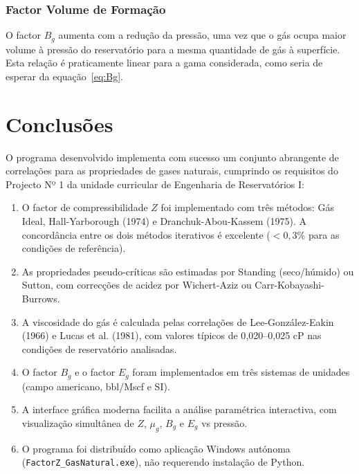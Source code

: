 \documentclass[12pt, a4paper]{article}
\begin{document}
\subsubsection{Factor Volume de Formação}

O factor $B_g$ aumenta com a redução da pressão, uma vez que o gás ocupa maior
volume à pressão do reservatório para a mesma quantidade de gás à superfície.
Esta relação é praticamente linear para a gama considerada, como seria de esperar
da equação~\eqref{eq:Bg}.

\section{Conclusões}

O programa desenvolvido implementa com sucesso um conjunto abrangente de
correlações para as propriedades de gases naturais, cumprindo os requisitos
do Projecto Nº 1 da unidade curricular de Engenharia de Reservatórios I:

\begin{enumerate}[leftmargin=1.5cm]
  \item O factor de compressibilidade $Z$ foi implementado com três métodos:
        Gás Ideal, Hall-Yarborough (1974) e Dranchuk-Abou-Kassem (1975).
        A concordância entre os dois métodos iterativos é excelente ($< 0{,}3\%$
        para as condições de referência).

  \item As propriedades pseudo-críticas são estimadas por Standing (seco/húmido)
        ou Sutton, com correcções de acidez por Wichert-Aziz ou Carr-Kobayashi-Burrows.

  \item A viscosidade do gás é calculada pelas correlações de
        Lee-González-Eakin (1966) e Lucas et al. (1981), com valores
        típicos de 0{,}020–0{,}025 cP nas condições de reservatório analisadas.

  \item O factor $B_g$ e o factor $E_g$ foram implementados em três sistemas
        de unidades (campo americano, bbl/Mscf e SI).

  \item A interface gráfica moderna facilita a análise paramétrica interactiva,
        com visualização simultânea de $Z$, $\mu_g$, $B_g$ e $E_g$ vs pressão.

  \item O programa foi distribuído como aplicação Windows autónoma
        (\texttt{FactorZ\_GasNatural.exe}), não requerendo instalação de Python.
\end{enumerate}
\end{document}
